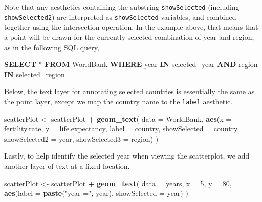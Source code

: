 \documentclass[12pt,]{article}
\newenvironment{Shaded}{\begin{snugshade}}{\end{snugshade}}
\newcommand{\DataTypeTok}[1]{\textcolor[rgb]{0.13,0.29,0.53}{#1}}
\newcommand{\DecValTok}[1]{\textcolor[rgb]{0.00,0.00,0.81}{#1}}
\newcommand{\KeywordTok}[1]{\textcolor[rgb]{0.13,0.29,0.53}{\textbf{#1}}}
\newcommand{\NormalTok}[1]{#1}
\newcommand{\OperatorTok}[1]{\textcolor[rgb]{0.81,0.36,0.00}{\textbf{#1}}}
\newcommand{\StringTok}[1]{\textcolor[rgb]{0.31,0.60,0.02}{#1}}
\theoremstyle{definition}
\theoremstyle{definition}
\theoremstyle{definition}
\theoremstyle{remark}
\begin{document}
Note that any aesthetics containing the substring \texttt{showSelected}
(including \texttt{showSelected2}) are interpreted as
\texttt{showSelected} variables, and combined together using the
intersection operation. In the example above, that means that a point
will be drawn for the currently selected combination of year and region,
as in the following SQL query,

\begin{Shaded}
\begin{Highlighting}[]
\KeywordTok{SELECT}\NormalTok{ * }\KeywordTok{FROM}\NormalTok{ WorldBank}
  \KeywordTok{WHERE} \DataTypeTok{year}   \KeywordTok{IN}\NormalTok{ selected_year}
  \KeywordTok{AND}\NormalTok{   region }\KeywordTok{IN}\NormalTok{ selected_region}
\end{Highlighting}
\end{Shaded}

Below, the text layer for annotating selected countries is essentially
the same as the point layer, except we map the country name to the
\texttt{label} aesthetic.

\begin{Shaded}
\begin{Highlighting}[]
\NormalTok{scatterPlot <-}\StringTok{ }\NormalTok{scatterPlot }\OperatorTok{+}\StringTok{ }\KeywordTok{geom_text}\NormalTok{(}
  \DataTypeTok{data =}\NormalTok{ WorldBank,}
  \KeywordTok{aes}\NormalTok{(}\DataTypeTok{x =}\NormalTok{ fertility.rate, }\DataTypeTok{y =}\NormalTok{ life.expectancy,}
      \DataTypeTok{label =}\NormalTok{ country,}
      \DataTypeTok{showSelected =}\NormalTok{ country,}
      \DataTypeTok{showSelected2 =}\NormalTok{ year,}
      \DataTypeTok{showSelected3 =}\NormalTok{ region)}
\NormalTok{)}
\end{Highlighting}
\end{Shaded}

Lastly, to help identify the selected year when viewing the scatterplot,
we add another layer of text at a fixed location.

\begin{Shaded}
\begin{Highlighting}[]
\NormalTok{scatterPlot <-}\StringTok{ }\NormalTok{scatterPlot }\OperatorTok{+}\StringTok{ }\KeywordTok{geom_text}\NormalTok{(}
  \DataTypeTok{data =}\NormalTok{ years, }\DataTypeTok{x =} \DecValTok{5}\NormalTok{, }\DataTypeTok{y =} \DecValTok{80}\NormalTok{,}
  \KeywordTok{aes}\NormalTok{(}\DataTypeTok{label =} \KeywordTok{paste}\NormalTok{(}\StringTok{"year ="}\NormalTok{, year),}
      \DataTypeTok{showSelected =}\NormalTok{ year)}
\NormalTok{)}
\end{Highlighting}
\end{Shaded}
\end{document}
